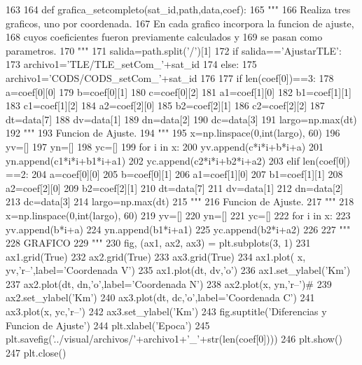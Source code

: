 \begin{DoxyCode}
163 
164 def grafica_setcompleto(sat_id,path,data,coef):
165     """
166     Realiza tres graficos, uno por coordenada.
167     En cada grafico incorpora la funcion de ajuste,
168     cuyos coeficientes fueron previamente calculados y
169     se pasan como parametros.
170     """
171     salida=path.split('/')[1]
172     if salida=='AjustarTLE':
173         archivo1='TLE/TLE_setCom_'+sat_id
174     else:
175         archivo1='CODS/CODS_setCom_'+sat_id
176     
177     if len(coef[0])==3:
178         a=coef[0][0]
179         b=coef[0][1]
180         c=coef[0][2]
181         a1=coef[1][0]
182         b1=coef[1][1]
183         c1=coef[1][2]
184         a2=coef[2][0]
185         b2=coef[2][1]
186         c2=coef[2][2]
187         dt=data[7]
188         dv=data[1]
189         dn=data[2]
190         dc=data[3]
191         largo=np.max(dt)
192         """
193         Funcion de Ajuste.
194         """
195         x=np.linspace(0,int(largo), 60)
196         yv=[]
197         yn=[]
198         yc=[]
199         for i in x:
200             yv.append(c*i*i+b*i+a)
201             yn.append(c1*i*i+b1*i+a1) 
202             yc.append(c2*i*i+b2*i+a2)            
203     elif len(coef[0]) ==2:
204         a=coef[0][0]
205         b=coef[0][1]
206         a1=coef[1][0]
207         b1=coef[1][1]
208         a2=coef[2][0]
209         b2=coef[2][1]
210         dt=data[7]
211         dv=data[1]
212         dn=data[2]
213         dc=data[3]
214         largo=np.max(dt)
215         """
216         Funcion de Ajuste.
217         """
218         x=np.linspace(0,int(largo), 60)
219         yv=[]
220         yn=[]
221         yc=[]
222         for i in x:
223             yv.append(b*i+a)
224             yn.append(b1*i+a1) 
225             yc.append(b2*i+a2)    
226            
227     """
228     GRAFICO
229     """
230     fig, (ax1, ax2, ax3) = plt.subplots(3, 1)
231     ax1.grid(True)
232     ax2.grid(True)
233     ax3.grid(True)
234     ax1.plot( x, yv,'r--',label='Coordenada V')
235     ax1.plot(dt, dv,'o')
236     ax1.set_ylabel('Km')
237     ax2.plot(dt, dn,'o',label='Coordenada N')
238     ax2.plot(x, yn,'r--')#
239     ax2.set_ylabel('Km')
240     ax3.plot(dt, dc,'o',label='Coordenada C')
241     ax3.plot(x, yc,'r--')
242     ax3.set_ylabel('Km')
243     fig.suptitle('Diferencias y Funcion de Ajuste')
244     plt.xlabel('Epoca')
245     plt.savefig('../visual/archivos/'+archivo1+'_'+str(len(coef[0])))
246     plt.show()
247     plt.close()
    
\end{DoxyCode}
